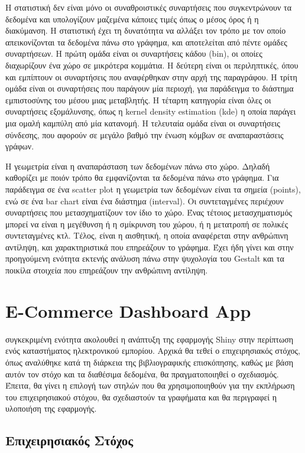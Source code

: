 \documentclass{article}
\begin{document}
Η στατιστική δεν είναι μόνο οι συναθροιστικές συναρτήσεις που συγκεντρώνουν τα δεδομένα και υπολογίζουν μαζεμένα κάποιες τιμές όπως ο μέσος όρος ή η διακύμανση. Η στατιστική έχει τη δυνατότητα να αλλάξει τον τρόπο με τον οποίο απεικονίζονται τα δεδομένα πάνω στο γράφημα, και αποτελείται από πέντε ομάδες συναρτήσεων. Η πρώτη ομάδα είναι οι συναρτήσεις κάδου (bin), οι οποίες διαχωρίζουν ένα χώρο σε μικρότερα κομμάτια. Η δεύτερη είναι οι περιληπτικές, όπου και εμπίπτουν οι συναρτήσεις που αναφέρθηκαν στην αρχή της παραγράφου. Η τρίτη ομάδα είναι οι συναρτήσεις που παράγουν μία περιοχή, για παράδειγμα το διάστημα εμπιστοσύνης του μέσου μιας μεταβλητής. Η τέταρτη κατηγορία είναι όλες οι συναρτήσεις εξομάλυνσης, όπως η kernel density estimation (kde) η οποία παράγει μια ομαλή καμπύλη από μία κατανομή. Η τελευταία ομάδα είναι οι συναρτήσεις σύνδεσης, που αφορούν σε μεγάλο βαθμό την ένωση κόμβων σε αναπαραστάσεις γράφων.

Η γεωμετρία είναι η αναπαράσταση των δεδομένων πάνω στο χώρο. Δηλαδή καθορίζει με ποιόν τρόπο θα εμφανίζονται τα δεδομένα πάνω στο γράφημα. Για παράδειγμα σε ένα scatter plot η γεωμετρία των δεδομένων είναι τα σημεία (points), ενώ σε ένα bar chart είναι ένα διάστημα (interval). Οι συντεταγμένες περιέχουν συναρτήσεις που μετασχηματίζουν τον ίδιο το χώρο. Ένας τέτοιος μετασχηματισμός μπορεί να είναι η μεγέθυνση ή η σμίκρυνση του χώρου, ή η μετατροπή σε πολικές συντεταγμένες κτλ. Τέλος, είναι η αισθητική, η οποία αναφέρεται στην ανθρώπινη αντίληψη, και χαρακτηριστικά που επηρεάζουν το γράφημα. Έχει ήδη γίνει και στην προηγούμενη ενότητα εκτενής ανάλυση πάνω στην ψυχολογία του Gestalt και τα ποικίλα στοιχεία που επηρεάζουν την ανθρώπινη αντίληψη.

\newpage

\section{E-Commerce Dashboard App}

 συγκεκριμένη ενότητα ακολουθεί η ανάπτυξη της εφαρμογής Shiny στην περίπτωση ενός καταστήματος ηλεκτρονικού εμπορίου. Αρχικά θα τεθεί ο επιχειρησιακός στόχος, όπως αναλύθηκε κατά τη διάρκεια της βιβλιογραφικής επισκόπησης, καθώς με βάση αυτόν τον στόχο και τα διαθέσιμα δεδομένα, θα πραγματοποιηθεί ο σχεδιασμός. Έπειτα, θα γίνει η επιλογή των στηλών που θα χρησιμοποιηθούν για την εκπλήρωση του επιχειρησιακού στόχου, θα σχεδιαστούν τα γραφήματα και θα περιγραφεί η υλοποιήση της εφαρμογής.

\subsection{Επιχειρησιακός Στόχος}
\end{document}
